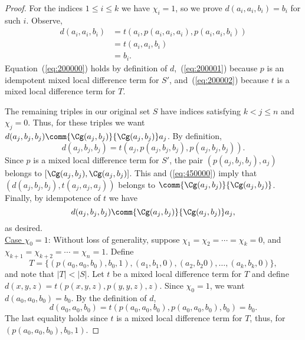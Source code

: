 \begin{proof}
For the indices $1\leq i \leq k$ we have $\chi_i =1$, so we prove
$d(a_i,a_i,b_i) = b_i$ for such $i$. Observe,
\begin{align}
  d(a_i,a_i,b_i) &=
  t(a_i, p(a_i,a_i,a_i), p(a_i,a_i,b_i)) \label{eq:200000}\\
  &=t(a_i, a_i, b_i) \label{eq:200001}\\
  &=b_i. \label{eq:200002}
\end{align}
Equation~(\ref{eq:200000}) holds by definition of $d$,~(\ref{eq:200001})
because $p$ is an idempotent mixed local difference term for
$S'$, and~(\ref{eq:200002}) because $t$ is a mixed local difference term for $T$.

The remaining triples in our original set $S$
have indices satisfying $k<j\leq n$ and $\chi_j = 0$.
Thus, for these triples we want
$d(a_j,b_j,b_j)\comm{\Cg(a_j,b_j)}{\Cg(a_j,b_j)} a_j$.
By definition,
\begin{equation}
  \label{eq:450000}
d(a_j,b_j,b_j) =t(a_j, p(a_j,b_j,b_j), p(a_j,b_j,b_j)).  
\end{equation}
Since $p$ is a mixed local difference term for $S'$, %
the pair $(p(a_j,b_j,b_j), a_j)$ belongs to $[\Cg(a_j,b_j), \Cg(a_j,b_j)]$.
This and 
(\ref{eq:450000}) imply
that 
$(d(a_j, b_j,b_j), t(a_j,a_j,a_j))$
belongs to
$\comm{\Cg(a_j,b_j)}{\Cg(a_j,b_j)}$.
Finally, by idempotence of $t$ we have
\[
d(a_j,b_j,b_j)\comm{\Cg(a_j,b_j)}{\Cg(a_j,b_j)} a_j,\]
as desired.
\\[6pt]
\underline{Case $\chi_0 = 1$}:
Without loss of generality, suppose $\chi_1 = \chi_2 =\cdots =\chi_k = 0$,
and $\chi_{k+1} = \chi_{k+2} = \cdots = \chi_{n} = 1$. Define 
\[
T = \{(p(a_0, a_0, b_0), b_0, 1),
(a_1, b_1, 0), (a_2, b_2 0), \dots, (a_k, b_k, 0)\},
\]
and note that $|T| < |S|$.
Let $t$ be a mixed local difference term for $T$ and
define
$d(x,y,z) = t(p(x,y,z), p(y,y,z), z)$. 
Since $\chi_0 =1$, we want $d(a_0,a_0,b_0) = b_0$. By the definition of
$d$,
\begin{equation*}
  d(a_0,a_0,b_0) =
  t(p(a_0,a_0,b_0), p(a_0,a_0,b_0), b_0) =b_0.
\end{equation*}
The last equality holds since $t$ is a mixed local difference term for $T$, thus,
for $(p(a_0, a_0, b_0), b_0, 1)$.


\end{proof}
